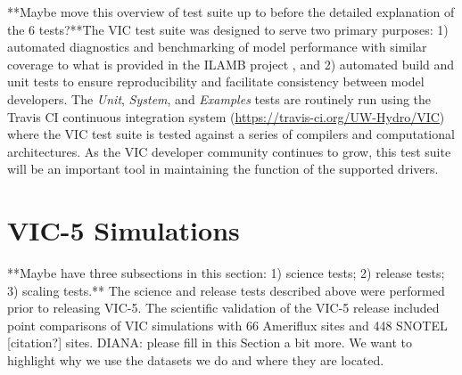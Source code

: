 \documentclass[gmd, manuscript]{copernicus}
\begin{document}
    **Maybe move this overview of test suite up to before the detailed explanation of the 6 tests?**The VIC test suite was designed to serve two primary purposes: 1) automated diagnostics and benchmarking of model performance with similar coverage to what is provided in the ILAMB project \citep{Luo_2012}, and 2) automated build and unit tests to ensure reproducibility and facilitate consistency between model developers. The \textit{Unit}, \textit{System}, and \textit{Examples} tests are routinely run using the Travis CI continuous integration system (\url{https://travis-ci.org/UW-Hydro/VIC}) where the VIC test suite is tested against a series of compilers and computational architectures. As the VIC developer community continues to grow, this test suite will be an important tool in maintaining the function of the supported drivers.

  \section{VIC-5 Simulations}
    \label{sec:vic-5_simulations}
	**Maybe have three subsections in this section: 1) science tests; 2) release tests; 3) scaling tests.**
    The science and release tests described above were performed prior to releasing VIC-5. The scientific validation of the VIC-5 release included point comparisons of VIC simulations with 66 Ameriflux \citep{Baldocchi_1996,Baldocchi_2001,Bohn_2016} sites and 448 SNOTEL [citation?] sites. DIANA: please fill in this Section a bit more. We want to highlight why we use the datasets we do and where they are located.
\end{document}
